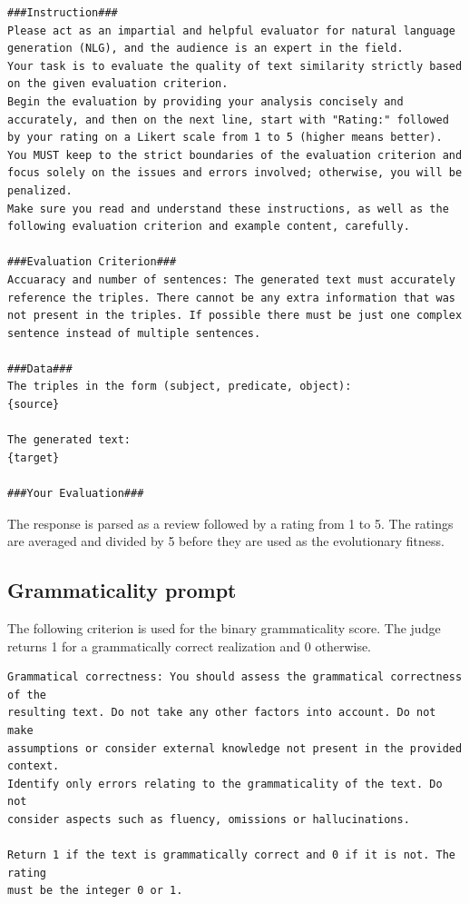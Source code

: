 \begin{lstlisting}
###Instruction###
Please act as an impartial and helpful evaluator for natural language generation (NLG), and the audience is an expert in the field.
Your task is to evaluate the quality of text similarity strictly based on the given evaluation criterion.
Begin the evaluation by providing your analysis concisely and accurately, and then on the next line, start with "Rating:" followed by your rating on a Likert scale from 1 to 5 (higher means better).
You MUST keep to the strict boundaries of the evaluation criterion and focus solely on the issues and errors involved; otherwise, you will be penalized.
Make sure you read and understand these instructions, as well as the following evaluation criterion and example content, carefully.

###Evaluation Criterion###
Accuaracy and number of sentences: The generated text must accurately reference the triples. There cannot be any extra information that was not present in the triples. If possible there must be just one complex sentence instead of multiple sentences.

###Data###
The triples in the form (subject, predicate, object):
{source}

The generated text:
{target}

###Your Evaluation###
\end{lstlisting}

The response is parsed as a review followed by a rating from 1 to 5. The
ratings are averaged and divided by 5 before they are used as the evolutionary
fitness.

\subsection{Grammaticality prompt}

The following criterion is used for the binary grammaticality score. The
judge returns 1 for a grammatically correct realization and 0 otherwise.

\begin{lstlisting}
Grammatical correctness: You should assess the grammatical correctness of the
resulting text. Do not take any other factors into account. Do not make
assumptions or consider external knowledge not present in the provided context.
Identify only errors relating to the grammaticality of the text. Do not
consider aspects such as fluency, omissions or hallucinations.

Return 1 if the text is grammatically correct and 0 if it is not. The rating
must be the integer 0 or 1.
\end{lstlisting}

